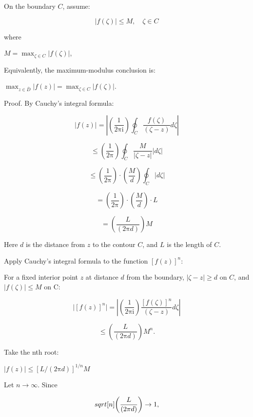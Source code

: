 \documentclass[11pt,a4paper]{article}
\theoremstyle{definition}
\theoremstyle{plain}
\begin{document}
On the boundary $C$, assume:

\begin{equation}
\vert{}f(\zeta)\vert{} \le M, \quad \zeta \in C
\end{equation}

where

$M = \max_{\zeta \in C}\vert{}f(\zeta)\vert{}$,

Equivalently, the maximum-modulus conclusion is:

$\max_{z \in \bar{D}}\vert{}f(z)\vert{} = \max_{\zeta \in C}\vert{}f(\zeta)\vert{}$.

Proof. By Cauchy's integral formula:

\begin{equation}
\vert{}f(z)\vert{} = \left\vert{}\left(\frac{1}{2\mathrm{\pi}\mathrm{i}}\right)\oint_{C}\frac{f(\zeta)}{(\zeta - z)}d\zeta\right\vert{}
\end{equation}

\[
\le\left(\frac{1}{2\mathrm{\pi}}\right)\oint_{C}\frac{M}{\vert{}\zeta - z\vert{}}\vert{}d\zeta\vert{}
\]

\[
\le\left(\frac{1}{2\mathrm{\pi}}\right) \cdot\left(\frac{M}{d}\right)\oint_{C}\vert{}d\zeta\vert{}
\]

\[
= \left(\frac{1}{2\mathrm{\pi}}\right) \cdot\left(\frac{M}{d}\right) \cdot L
\]

\[
= \left(\frac{L}{(2\mathrm{\pi}d)}\right)M
\]

Here $d$ is the distance from $z$ to the contour $C$, and $L$ is the length of $C$.

Apply Cauchy's integral formula to the function $[f(z)]^{n}$:

For a fixed interior point $z$ at distance $d$ from the boundary, $\vert{}\zeta - z\vert{} \ge d$ on $C$, and $\vert{}f(\zeta)\vert{} \le M$ on C:

\begin{equation}
\vert{}[f(z)]^{n}\vert{} = \left\vert{}\left(\frac{1}{2\mathrm{\pi}\mathrm{i}}\right)\frac{[f(\zeta)]^{n}}{(\zeta - z)}d\zeta\right\vert{}
\end{equation}

\[
\le\left(\frac{L}{(2\mathrm{\pi}d)}\right)M^{n}.
\]

Take the nth root:

$\vert{}f(z)\vert{} \le[L/(2\mathrm{\pi}d)]^{1/n}M$

Let $n \to \infty$. Since

\begin{equation}
\\sqrt[n]{\left(\frac{L}{(2\mathrm{\pi}d)}\right)} \to 1,
\end{equation}
\end{document}
